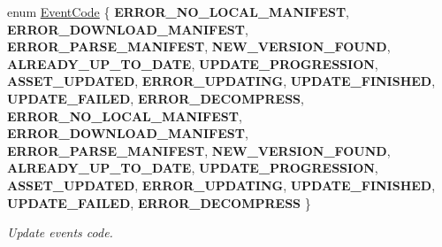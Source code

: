\begin{DoxyCompactItemize}
enum \hyperlink{classEventAssetsManagerEx_ae48992cd906169f84a146e7ae8851cae}{Event\+Code} \{ \newline
{\bfseries E\+R\+R\+O\+R\+\_\+\+N\+O\+\_\+\+L\+O\+C\+A\+L\+\_\+\+M\+A\+N\+I\+F\+E\+ST}, 
{\bfseries E\+R\+R\+O\+R\+\_\+\+D\+O\+W\+N\+L\+O\+A\+D\+\_\+\+M\+A\+N\+I\+F\+E\+ST}, 
{\bfseries E\+R\+R\+O\+R\+\_\+\+P\+A\+R\+S\+E\+\_\+\+M\+A\+N\+I\+F\+E\+ST}, 
{\bfseries N\+E\+W\+\_\+\+V\+E\+R\+S\+I\+O\+N\+\_\+\+F\+O\+U\+ND}, 
\newline
{\bfseries A\+L\+R\+E\+A\+D\+Y\+\_\+\+U\+P\+\_\+\+T\+O\+\_\+\+D\+A\+TE}, 
{\bfseries U\+P\+D\+A\+T\+E\+\_\+\+P\+R\+O\+G\+R\+E\+S\+S\+I\+ON}, 
{\bfseries A\+S\+S\+E\+T\+\_\+\+U\+P\+D\+A\+T\+ED}, 
{\bfseries E\+R\+R\+O\+R\+\_\+\+U\+P\+D\+A\+T\+I\+NG}, 
\newline
{\bfseries U\+P\+D\+A\+T\+E\+\_\+\+F\+I\+N\+I\+S\+H\+ED}, 
{\bfseries U\+P\+D\+A\+T\+E\+\_\+\+F\+A\+I\+L\+ED}, 
{\bfseries E\+R\+R\+O\+R\+\_\+\+D\+E\+C\+O\+M\+P\+R\+E\+SS}, 
{\bfseries E\+R\+R\+O\+R\+\_\+\+N\+O\+\_\+\+L\+O\+C\+A\+L\+\_\+\+M\+A\+N\+I\+F\+E\+ST}, 
\newline
{\bfseries E\+R\+R\+O\+R\+\_\+\+D\+O\+W\+N\+L\+O\+A\+D\+\_\+\+M\+A\+N\+I\+F\+E\+ST}, 
{\bfseries E\+R\+R\+O\+R\+\_\+\+P\+A\+R\+S\+E\+\_\+\+M\+A\+N\+I\+F\+E\+ST}, 
{\bfseries N\+E\+W\+\_\+\+V\+E\+R\+S\+I\+O\+N\+\_\+\+F\+O\+U\+ND}, 
{\bfseries A\+L\+R\+E\+A\+D\+Y\+\_\+\+U\+P\+\_\+\+T\+O\+\_\+\+D\+A\+TE}, 
\newline
{\bfseries U\+P\+D\+A\+T\+E\+\_\+\+P\+R\+O\+G\+R\+E\+S\+S\+I\+ON}, 
{\bfseries A\+S\+S\+E\+T\+\_\+\+U\+P\+D\+A\+T\+ED}, 
{\bfseries E\+R\+R\+O\+R\+\_\+\+U\+P\+D\+A\+T\+I\+NG}, 
{\bfseries U\+P\+D\+A\+T\+E\+\_\+\+F\+I\+N\+I\+S\+H\+ED}, 
\newline
{\bfseries U\+P\+D\+A\+T\+E\+\_\+\+F\+A\+I\+L\+ED}, 
{\bfseries E\+R\+R\+O\+R\+\_\+\+D\+E\+C\+O\+M\+P\+R\+E\+SS}
 \}\begin{DoxyCompactList}\small\item\em Update events code. \end{DoxyCompactList}
\end{DoxyCompactItemize}
